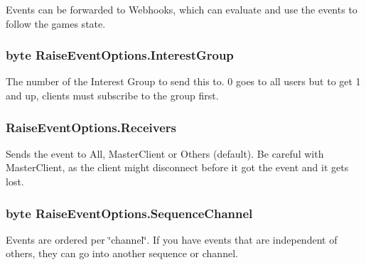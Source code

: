 Events can be forwarded to Webhooks, which can evaluate and use the events to follow the game\textquotesingle{}s state.

\subsubsection[{\texorpdfstring{Interest\+Group}{InterestGroup}}]{\setlength{\rightskip}{0pt plus 5cm}byte Raise\+Event\+Options.\+Interest\+Group}\hypertarget{class_raise_event_options_ab9fdfe47e82d2d049a347e7df4cef701}{}\label{class_raise_event_options_ab9fdfe47e82d2d049a347e7df4cef701}


The number of the Interest Group to send this to. 0 goes to all users but to get 1 and up, clients must subscribe to the group first.

\subsubsection[{\texorpdfstring{Receivers}{Receivers}}]{ Raise\+Event\+Options.\+Receivers}\hypertarget{class_raise_event_options_a0df0c168fd813e5041f1b0afc6826a75}{}\label{class_raise_event_options_a0df0c168fd813e5041f1b0afc6826a75}


Sends the event to All, Master\+Client or Others (default). Be careful with Master\+Client, as the client might disconnect before it got the event and it gets lost.

\subsubsection[{\texorpdfstring{Sequence\+Channel}{SequenceChannel}}]{\setlength{\rightskip}{0pt plus 5cm}byte Raise\+Event\+Options.\+Sequence\+Channel}\hypertarget{class_raise_event_options_a3fff0d28599564c9d69c147ea39682d6}{}\label{class_raise_event_options_a3fff0d28599564c9d69c147ea39682d6}


Events are ordered per \char`\"{}channel\char`\"{}. If you have events that are independent of others, they can go into another sequence or channel.

